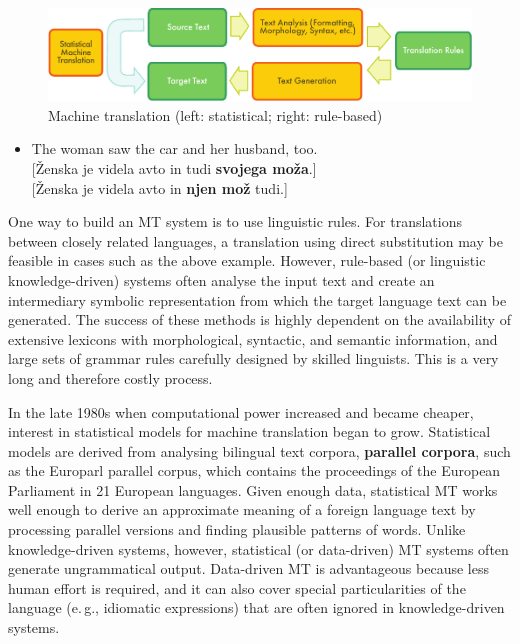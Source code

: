 \begin{multicols}{2}
\begin{figure}[htb]
  \center
  \includegraphics[width=\textwidth]{../_media/english/machine_translation}
  \caption{Machine translation (left: statistical; right: rule-based)}
  \label{fig:mtarch_en}
\end{figure}

\begin{itemize}
\item[] The woman saw the car and her husband, too.\\[1mm]
  {[}Ženska je videla avto in tudi \textbf{svojega moža}.{]}\\
  {[}Ženska je videla avto in \textbf{njen mož} tudi.{]}
\end{itemize}

One way to build an MT system is to use linguistic rules. For translations between closely related languages, a translation using direct substitution may be feasible in cases such as the above example. However, rule-based (or linguistic knowledge-driven) systems often analyse the input text and create an intermediary symbolic representation from which the target language text can be generated. The success of these methods is highly dependent on the availability of extensive lexicons with morphological, syntactic, and semantic information, and large sets of grammar rules carefully designed by skilled linguists. This is a very long and therefore costly process.

In the late 1980s when computational power increased and became cheaper, interest in statistical models for machine translation began to grow. Statistical models are derived from analysing bilingual text corpora, \textbf{parallel corpora}, such as the Europarl parallel corpus, which contains the proceedings of the European Parliament in 21 European languages. Given enough data, statistical MT works well enough to derive an approximate meaning of a foreign language text by processing parallel versions and finding plausible patterns of words. Unlike knowledge-driven systems, however, statistical (or data-driven) MT systems often generate ungrammatical output. Data-driven MT is advantageous because less human effort is required, and it can also cover special particularities of the language (e.\,g., idiomatic expressions) that are often ignored in knowledge-driven systems. 


\end{multicols}
